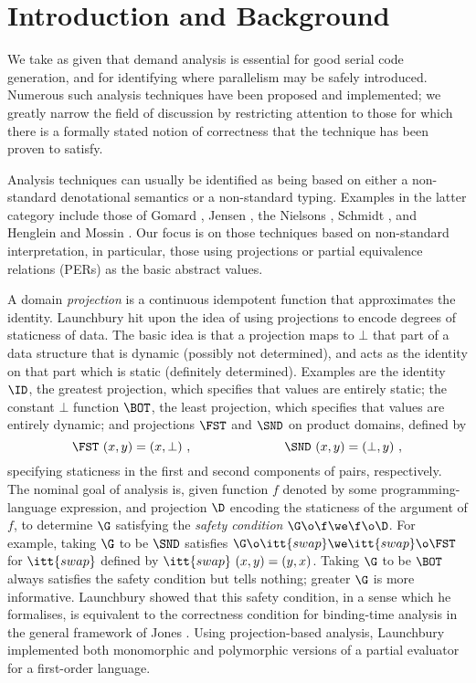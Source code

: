 \documentclass[11pt]{article}
\begin{document}


\section{Introduction and Background}

We take as given that demand analysis is essential for good serial code
generation, and for identifying where parallelism may be safely introduced.
Numerous such analysis techniques have been proposed and implemented; we
greatly narrow the field of discussion by restricting attention to those for
which there is a formally stated notion of correctness that the technique has
been proven to satisfy.

Analysis techniques can usually be identified as being based on either
a non-standard denotational semantics or a non-standard typing.
Examples in the latter category include those of Gomard \cite{Go92},
Jensen \cite{Jen92}, the Nielsons \cite{NN88}, Schmidt \cite{Sch88},
and Henglein and Mossin \cite{HM94}.  Our focus is on those techniques
based on non-standard interpretation, in particular, those using
projections or partial equivalence relations (PERs) as the basic
abstract values.

A domain {\it projection\/} is a continuous idempotent function that
approximates the identity.  Launchbury \cite{Lau88} hit upon the idea
of using projections to encode degrees of staticness of data.  The
basic idea is that a projection maps to $\bot$ that part of a data
structure that is dynamic (possibly not determined), and acts as the
identity on that part which is static (definitely determined).
Examples are the identity $\ID$, the greatest projection, which
specifies that values are entirely static; the constant $\bot$
function $\BOT$, the least projection, which specifies that values are
entirely dynamic; and projections $\FST$ and $\SND$ on product
domains, defined by
\[
\FST\ (x,y) = (x,\bot)\ ,\hspace{1.0in} \SND\ (x,y) = (\bot,y)\ ,
\]
specifying staticness in the first and second components of pairs,
respectively.  The nominal goal of analysis is, given function $f$
denoted by some programming-language expression, and projection $\D$
encoding the staticness of the argument of $f$, to determine $\G$
satisfying the {\it safety condition\/} $\G\o\f\we\f\o\D$.  For
example, taking $\G$ to be $\SND$ satisfies
$\G\o\itt{swap}\we\itt{swap}\o\FST$ for $\itt{swap}$ defined by
$\itt{swap}~(x,y)=(y,x)$.  Taking $\G$ to be $\BOT$ always satisfies
the safety condition but tells nothing; greater $\G$ is more
informative.  Launchbury \cite{Lau91a} showed that this safety
condition, in a sense which he formalises, is equivalent
to the correctness condition for binding-time analysis in the general
framework of Jones \cite{Jon88}.  Using projection-based analysis,
Launchbury implemented both monomorphic and polymorphic versions of a
partial evaluator for a first-order language.
\end{document}
